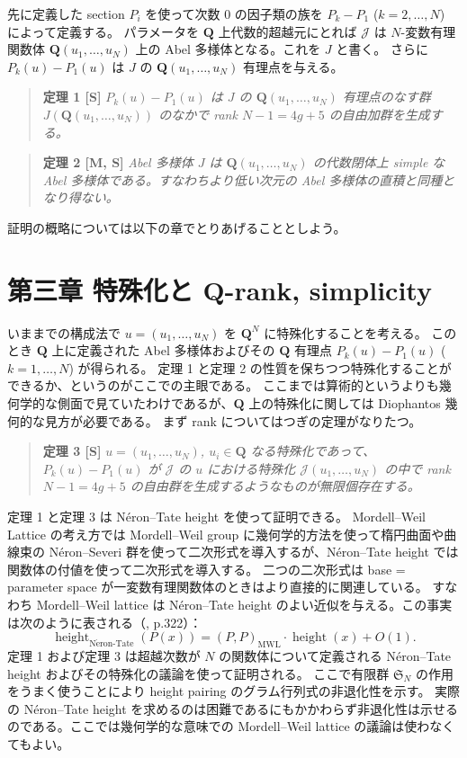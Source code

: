 \documentclass[uplatex,dvipdfmx]{jlreq}
\def\height{\operatorname{height}}
\begin{document}
先に定義した section $P_i$ を使って次数 $0$ の因子類の族を $P_k - P_1$ ($k = 2, \dots, N$) によって定義する。
パラメータを $\mathbf{Q}$ 上代数的超越元にとれば $\mathcal{J}$ は $N$-変数有理関数体 $\mathbf{Q}(u_1, \dots, u_N)$ 上の Abel 多様体となる。これを $J$ と書く。
さらに $P_k(u) - P_1(u)$ は $J$ の $\mathbf{Q}(u_1, \dots, u_N)$ 有理点を与える。

\begin{quote}
\textbf{定理 1 [S]}\quad
\textit{$P_k(u) - P_1(u)$ は $J$ の $\mathbf{Q}(u_1, \dots, u_N)$ 有理点のなす群 $J(\mathbf{Q}(u_1, \dots, u_N))$ のなかで rank $N - 1 = 4g + 5$ の自由加群を生成する。}
\end{quote}

\begin{quote}
\textbf{定理 2 [M, S]}\quad
\textit{Abel 多様体 $J$ は $\mathbf{Q}(u_1, \dots, u_N)$ の代数閉体上 simple な Abel 多様体である。すなわちより低い次元の Abel 多様体の直積と同種となり得ない。}
\end{quote}

証明の概略については以下の章でとりあげることとしよう。


\section*{第三章 特殊化と $\mathbf{Q}$-rank, simplicity}

いままでの構成法で $u = (u_1, \dots, u_N)$ を $\mathbf{Q}^N$ に特殊化することを考える。
このとき $\mathbf{Q}$ 上に定義された Abel 多様体およびその $\mathbf{Q}$ 有理点 $P_k(u) - P_1(u)$ ($k = 1, \dots, N$) が得られる。
定理 1 と定理 2 の性質を保ちつつ特殊化することができるか、というのがここでの主眼である。
ここまでは算術的というよりも幾何学的な側面で見ていたわけであるが、$\mathbf{Q}$ 上の特殊化に関しては Diophantos 幾何的な見方が必要である。
まず rank についてはつぎの定理がなりたつ。

\begin{quote}
\textbf{定理 3 [S]}\quad
\textit{$u = (u_1, \dots, u_N)$, $u_i \in \mathbf{Q}$ なる特殊化であって、$P_k(u) - P_1(u)$ が $\mathcal{J}$ の $u$ における特殊化 $\mathcal{J}(u_1, \dots, u_N)$ の中で rank $N - 1 = 4g + 5$ の自由群を生成するようなものが無限個存在する。}
\end{quote}

定理 1 と定理 3 は Néron--Tate height を使って証明できる。
Mordell--Weil Lattice の考え方では Mordell--Weil group に幾何学的方法を使って楕円曲面や曲線束の Néron--Severi 群を使って二次形式を導入するが、Néron--Tate height では関数体の付値を使って二次形式を導入する。
二つの二次形式は base = parameter space が一変数有理関数体のときはより直接的に関連している。
すなわち Mordell--Weil lattice は Néron--Tate height のよい近似を与える。この事実は次のように表される（\cite{L}, p.322）：
\[
  \height_{\mathrm{N\acute{e}ron\text{-}Tate}}(P(x))
  = (P, P)_{\mathrm{MWL}} \cdot \height(x) + O(1).
\]
定理 1 および定理 3 は超越次数が $N$ の関数体について定義される Néron--Tate height およびその特殊化の議論を使って証明される。
ここで有限群 $\mathfrak{S}_N$ の作用をうまく使うことにより height pairing のグラム行列式の非退化性を示す。
実際の Néron--Tate height を求めるのは困難であるにもかかわらず非退化性は示せるのである。ここでは幾何学的な意味での Mordell--Weil lattice の議論は使わなくてもよい。
\end{document}
